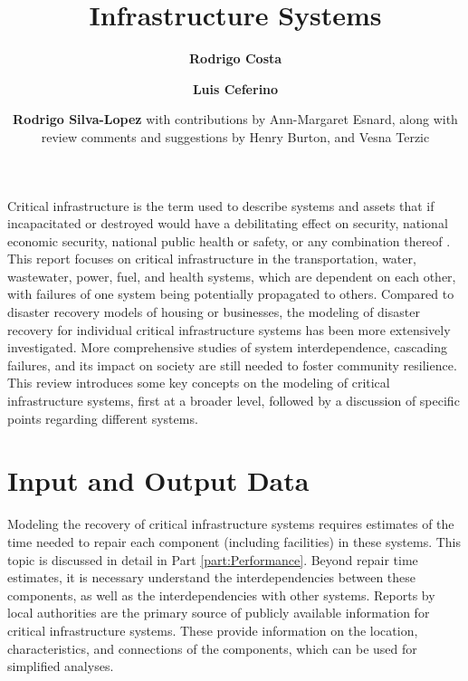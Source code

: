 \title{Infrastructure Systems}
\author{
    \textbf{Rodrigo Costa}
    \and \textbf{Luis Ceferino}
    \and \textbf{Rodrigo Silva-Lopez}
    with contributions by Ann-Margaret Esnard,
    \newline
    along with review comments and suggestions by Henry Burton, and Vesna Terzic
}
\tocauthor{}
%
%
\maketitle
Critical infrastructure is the term used to describe systems and assets that if incapacitated or destroyed would have a debilitating effect on security, national economic security, national public health or safety, or any combination thereof \citep{DHS_CI}. This report focuses on critical infrastructure in the transportation, water, wastewater, power, fuel, and health systems, which are dependent on each other, with failures of one system being potentially propagated to others. Compared to disaster recovery models of housing or businesses, the modeling of disaster recovery for individual critical infrastructure systems has been more extensively investigated.  More comprehensive studies of system interdependence, cascading failures, and its impact on society are still needed to foster community resilience. This review introduces some key concepts on the modeling of critical infrastructure systems, first at a broader level, followed by a discussion of specific points regarding different systems.\ 

\FloatBarrier
\section{Input and Output Data}
Modeling the recovery of critical infrastructure systems requires estimates of the time needed to repair each component (including facilities) in these systems. This topic is discussed in detail in Part \ref{part:Performance}. Beyond repair time estimates, it is necessary understand the interdependencies between these components, as well as the interdependencies with other systems. Reports by local authorities are the primary source of publicly available information for critical infrastructure systems. These provide information on the location, characteristics, and connections of the components, which can be used for simplified analyses.

